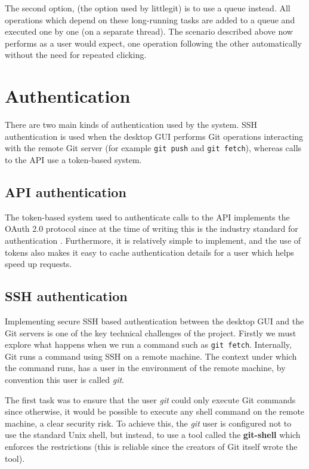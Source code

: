 The second option, (the option used by littlegit) is to use a queue instead. All operations which depend on these long-running tasks are added to a queue and executed one by one (on a separate thread). The scenario described above now performs as a user would expect, one operation following the other automatically without the need for repeated clicking.

\section{Authentication}

There are two main kinds of authentication used by the system. SSH authentication is used when the desktop GUI performs Git operations interacting with the remote Git server (for example \texttt{git push} and \texttt{git fetch}), whereas calls to the API use a token-based system. 

\subsection{API authentication}

The token-based system used to authenticate calls to the API implements the OAuth 2.0 protocol since at the time of writing this is the industry standard for authentication \cite{oauth2}. Furthermore, it is relatively simple to implement, and the use of tokens also makes it easy to cache authentication details for a user which helps speed up requests.

\subsection{SSH authentication}

Implementing secure SSH based authentication between the desktop GUI and the Git servers is one of the key technical challenges of the project. Firstly we must explore what happens when we run a command such as \texttt{git fetch}. Internally, Git runs a command using SSH on a remote machine. The context under which the command runs, has a user in the environment of the remote machine, by convention this user is called \emph{git}. 

The first task was to ensure that the user \emph{git} could only execute Git commands since otherwise, it would be possible to execute any shell command on the remote machine, a clear security risk. To achieve this, the \emph{git} user is configured not to use the standard Unix shell, but instead, to use a tool called the \textbf{git-shell} \cite{git-shell} which enforces the restrictions (this is reliable since the creators of Git itself wrote the tool).

